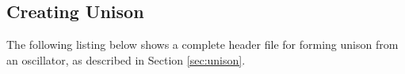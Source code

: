 \subsection{Creating Unison}
\label{app:unison_code}

The following listing below shows a complete header file for forming unison from an 
oscillator, as described in Section \ref{sec:unison}.


